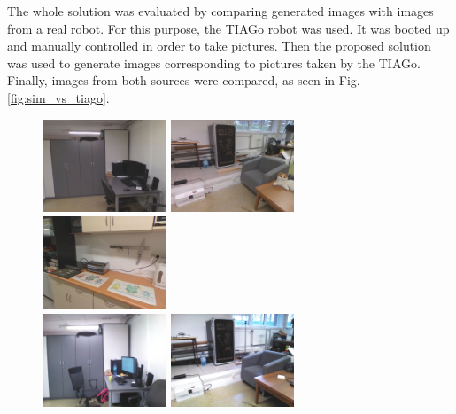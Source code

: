 \documentclass{svproc}
\begin{document}
The whole solution was evaluated by comparing generated images with images from a real robot.
For this purpose, the TIAGo robot was used.
It was booted up and manually controlled in order to take pictures.
Then the proposed solution was used to generate images corresponding to pictures taken by the TIAGo.
Finally, images from both sources were compared, as seen in Fig. \ref{fig:sim_vs_tiago}.

\begin{figure}[!ht]
    \centering
    \includegraphics[width=0.33\textwidth]{img/sim_vs_tiago/sim_biurko.jpg}\hfill%
    \includegraphics[width=0.33\textwidth]{img/sim_vs_tiago/sim_fotel.jpg}\hfill%
    \includegraphics[width=0.33\textwidth]{img/sim_vs_tiago/sim_kuchnia_blat.jpg}\\
    \includegraphics[width=0.33\textwidth]{img/sim_vs_tiago/tia_biurko.jpg}\hfill%
    \includegraphics[width=0.33\textwidth]{img/sim_vs_tiago/tia_fotel.jpg}\hfill%

\end{figure}
\end{document}
